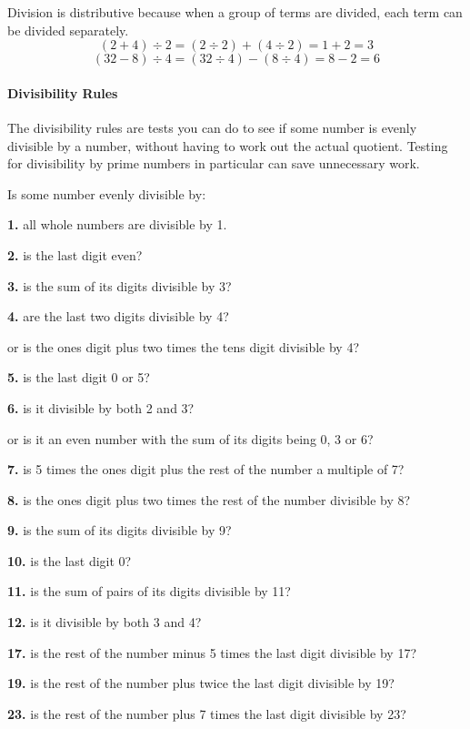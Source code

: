 \documentclass[12pt]{article}
\begin{document}
Division is distributive because when a group of terms are divided, each term can be divided separately.
$$(2 + 4) \div 2 = (2 \div 2) + (4 \div 2) = 1+2 = 3$$
$$(32-8) \div 4 = (32 \div 4) -(8 \div 4) = 8-2=6$$

\paragraph{Divisibility Rules}

The divisibility rules are tests you can do to see if some number is evenly divisible by a number, without having to work out the actual quotient. Testing for divisibility by prime numbers in particular can save unnecessary work.

Is some number evenly divisible by:

\textbf{1.} all whole numbers are divisible by 1.

\textbf{2.} is the last digit even?

\textbf{3.} is the sum of its digits divisible by 3?

\textbf{4.} are the last two digits divisible by 4?

\hspace{2ex} or is the ones digit plus two times the tens digit divisible by 4?

\textbf{5.} is the last digit 0 or 5?

\textbf{6.} is it divisible by both 2 and 3?

\hspace{2ex}or is it an even number with the sum of its digits being 0, 3 or 6?

\textbf{7.} is 5 times the ones digit plus the rest of the number a multiple of 7?

\textbf{8.} is the ones digit plus two times the rest of the number divisible by 8?

\textbf{9.} is the sum of its digits divisible by 9?

\textbf{10.} is the last digit 0?

\textbf{11.} is the sum of pairs of its digits divisible by 11?

\textbf{12.} is it divisible by both 3 and 4?

\textbf{17.} is the rest of the number minus 5 times the last digit divisible by 17?

\textbf{19.} is the rest of the number plus twice the last digit divisible by 19?

\textbf{23.} is the rest of the number plus 7 times the last digit divisible by 23?
\end{document}
